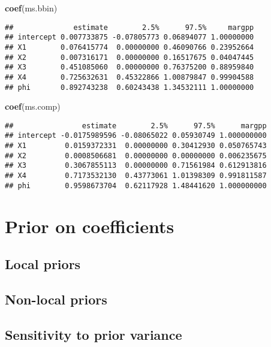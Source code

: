 \documentclass[
]{book}
\newenvironment{Shaded}{\begin{snugshade}}{\end{snugshade}}
\newcommand{\FunctionTok}[1]{\textcolor[rgb]{0.13,0.29,0.53}{\textbf{#1}}}
\newcommand{\NormalTok}[1]{#1}
\theoremstyle{definition}
\theoremstyle{definition}
\theoremstyle{definition}
\theoremstyle{definition}
\theoremstyle{remark}
\begin{document}
\begin{Shaded}
\begin{Highlighting}[]
\FunctionTok{coef}\NormalTok{(ms.bbin)}
\end{Highlighting}
\end{Shaded}

\begin{verbatim}
##              estimate        2.5%      97.5%     margpp
## intercept 0.007733875 -0.07805773 0.06894077 1.00000000
## X1        0.076415774  0.00000000 0.46090766 0.23952664
## X2        0.007316171  0.00000000 0.16517675 0.04047445
## X3        0.451085060  0.00000000 0.76375200 0.88959840
## X4        0.725632631  0.45322866 1.00879847 0.99904588
## phi       0.892743238  0.60243438 1.34532111 1.00000000
\end{verbatim}

\begin{Shaded}
\begin{Highlighting}[]
\FunctionTok{coef}\NormalTok{(ms.comp)}
\end{Highlighting}
\end{Shaded}

\begin{verbatim}
##                estimate        2.5%      97.5%      margpp
## intercept -0.0175989596 -0.08065022 0.05930749 1.000000000
## X1         0.0159372331  0.00000000 0.30412930 0.050765743
## X2         0.0008506681  0.00000000 0.00000000 0.006235675
## X3         0.3067855113  0.00000000 0.71561984 0.612913816
## X4         0.7173532130  0.43773061 1.01398309 0.991811587
## phi        0.9598673704  0.62117928 1.48441620 1.000000000
\end{verbatim}

\section{Prior on coefficients}\label{bms-coefprior}

\subsection{Local priors}\label{bms-localprior}

\subsection{Non-local priors}\label{bms-nlp}

\subsection{Sensitivity to prior variance}\label{bms-priorvar}
\end{document}
